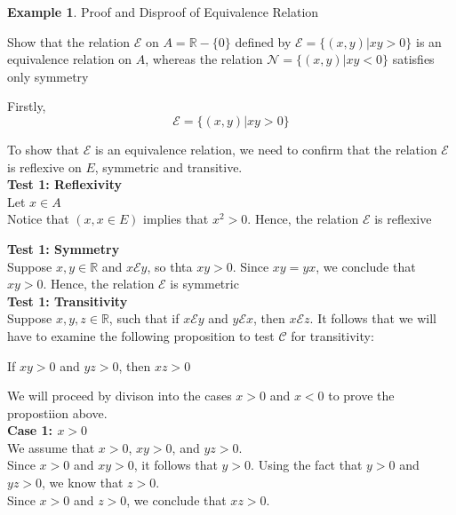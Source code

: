 \documentclass{book}
\theoremstyle{definition}
\newtheorem{example}{Example}[definition]
\theoremstyle{remark}
\newcommand{\bb}[1]{\mathbb{#1}}
\newcommand{\cc}[1]{\mathcal{#1}}
\begin{document}
    
    \begin{example}
    Proof and Disproof of Equivalence Relation \\
        \begin{tcolorbox}
            Show that the relation $\cc{E}$ on $A = \bb{R} - \{0 \}$ defined by $\cc{E} = \{ (x,y) | xy > 0 \}$ is an equivalence relation on $A$, whereas the relation $\cc{N} = \{ (x,y) | xy < 0 \}$ satisfies only symmetry
        \end{tcolorbox}
        
            
        Firstly, \\
            \begin{equation*}
                \cc{E} = \{ (x,y) | xy > 0 \}
            \end{equation*}
        
        To show that $\cc{E}$ is an equivalence relation, we need to confirm that the relation $\cc{E}$ is reflexive on $E$, symmetric and transitive. \\

            \textbf{Test 1: Reflexivity } \\
                Let $x \in A$ \\
                Notice that $(x,x \in E)$ implies that $x^2 > 0$. Hence, the relation $\cc{E}$ is reflexive
            
            \textbf{Test 1: Symmetry } \\
                Suppose $x,y \in \bb{R}$ and $x \cc{E} y$, so thta $xy >0$. Since $xy = yx$, we conclude that $xy > 0$. Hence, the relation $\cc{E}$ is symmetric \\
            
            \textbf{Test 1: Transitivity } \\
                 Suppose $x,y,z \in \bb{R}$, such that if $x \cc{E} y$ and $y \cc{E} x$, then $x \cc{E} z$. It follows that we will have to examine the following proposition to test $\cc{C}$ for transitivity:
                    \begin{center}
                        If $xy > 0$ and $yz > 0$, then $xz > 0$
                    \end{center}
                We will proceed by divison into the cases $x>0$ and $x<0$ to prove the propostiion above. \\
                
                \textbf{Case 1: $x>0$} \\
                    We assume that $x>0$, $xy > 0$, and $yz >0$. \\
                    Since $x >0 $ and $xy > 0$, it follows that $y>0$. Using the fact that $y>0$ and $yz > 0$, we know that $z > 0$. \\
                    Since $x > 0$ and $z > 0$, we conclude that $xz > 0$. \\
                

\end{example}
\end{document}
